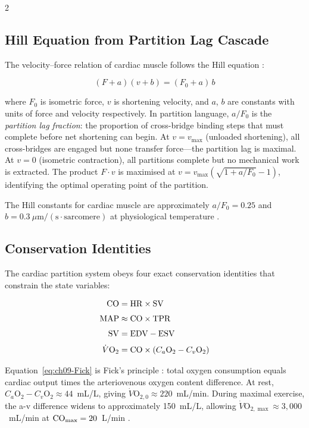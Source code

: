\begin{multicols}{2}

\subsection{Hill Equation from Partition Lag Cascade}

The velocity--force relation of cardiac muscle follows the Hill
equation \citep{hill1938heat}:

\begin{equation}
(F + a)(v + b) = (F_0 + a)\,b
\label{eq:ch09-hill}
\end{equation}

where $F_0$ is isometric force, $v$ is shortening velocity, and
$a$, $b$ are constants with units of force and velocity respectively.
In partition language, $a/F_0$ is the \emph{partition lag fraction}:
the proportion of cross-bridge binding steps that must complete before
net shortening can begin. At $v = v_{\max}$ (unloaded shortening),
all cross-bridges are engaged but none transfer force---the partition
lag is maximal. At $v = 0$ (isometric contraction), all partitions
complete but no mechanical work is extracted. The product
$F \cdot v$ is maximised at $v = v_{\max}(\sqrt{1 + a/F_0} - 1)$,
identifying the optimal operating point of the partition.

The Hill constants for cardiac muscle are approximately
$a/F_0 = 0.25$ and $b = 0.3~\mu\mathrm{m}/(\mathrm{s}\cdot
\mathrm{sarcomere})$ at physiological temperature
\citep{kass1988influence}.

\columnbreak

\subsection{Conservation Identities}

The cardiac partition system obeys four exact conservation
identities that constrain the state variables:

\begin{align}
\mathrm{CO} &= \mathrm{HR} \times \mathrm{SV} \label{eq:ch09-CO} \\[3pt]
\mathrm{MAP} &\approx \mathrm{CO} \times \mathrm{TPR} \label{eq:ch09-MAP} \\[3pt]
\mathrm{SV} &= \mathrm{EDV} - \mathrm{ESV} \label{eq:ch09-SV} \\[3pt]
\dot{V}\mathrm{O}_2 &= \mathrm{CO} \times (C_a\mathrm{O}_2 - C_v\mathrm{O}_2) \label{eq:ch09-Fick}
\end{align}

Equation~\eqref{eq:ch09-Fick} is Fick's principle
\citep{fick1855diffusion}: total oxygen consumption equals cardiac
output times the arteriovenous oxygen content difference. At rest,
$C_a\mathrm{O}_2 - C_v\mathrm{O}_2 \approx 44$~mL/L, giving
$\dot{V}\mathrm{O}_{2,0} \approx 220$~mL/min. During maximal
exercise, the a-v difference widens to approximately 150~mL/L,
allowing $\dot{V}\mathrm{O}_{2,\max} \approx 3{,}000$~mL/min
at $\mathrm{CO}_{\max} = 20$~L/min \citep{burkhoff1993contractility}.

\end{multicols}

